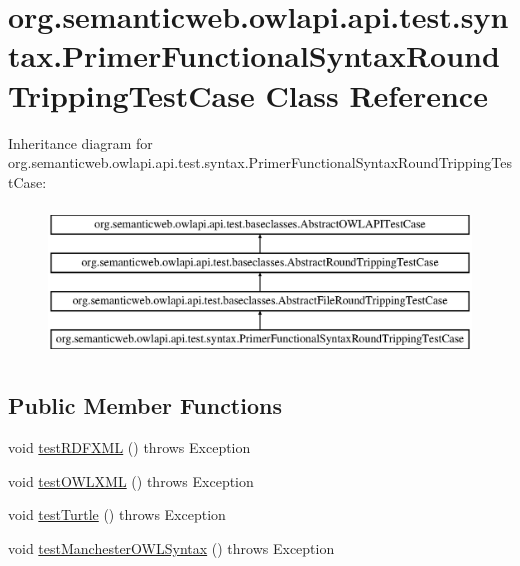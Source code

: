 \hypertarget{classorg_1_1semanticweb_1_1owlapi_1_1api_1_1test_1_1syntax_1_1_primer_functional_syntax_round_tripping_test_case}{\section{org.\-semanticweb.\-owlapi.\-api.\-test.\-syntax.\-Primer\-Functional\-Syntax\-Round\-Tripping\-Test\-Case Class Reference}
\label{classorg_1_1semanticweb_1_1owlapi_1_1api_1_1test_1_1syntax_1_1_primer_functional_syntax_round_tripping_test_case}
}
Inheritance diagram for org.\-semanticweb.\-owlapi.\-api.\-test.\-syntax.\-Primer\-Functional\-Syntax\-Round\-Tripping\-Test\-Case\-:\begin{figure}[H]
\begin{center}
\leavevmode
\includegraphics[height=4.000000cm]{classorg_1_1semanticweb_1_1owlapi_1_1api_1_1test_1_1syntax_1_1_primer_functional_syntax_round_tripping_test_case}
\end{center}
\end{figure}
\subsection*{Public Member Functions}
\begin{DoxyCompactItemize}
\item 
void \hyperlink{classorg_1_1semanticweb_1_1owlapi_1_1api_1_1test_1_1syntax_1_1_primer_functional_syntax_round_tripping_test_case_a316cb381d11c546f16313dea9ced056a}{test\-R\-D\-F\-X\-M\-L} ()  throws Exception 
\item 
void \hyperlink{classorg_1_1semanticweb_1_1owlapi_1_1api_1_1test_1_1syntax_1_1_primer_functional_syntax_round_tripping_test_case_a9140986b22efa92f1cca1822c5839be7}{test\-O\-W\-L\-X\-M\-L} ()  throws Exception 
\item 
void \hyperlink{classorg_1_1semanticweb_1_1owlapi_1_1api_1_1test_1_1syntax_1_1_primer_functional_syntax_round_tripping_test_case_a081ee4bb2902d1d9480ba2cc658a169d}{test\-Turtle} ()  throws Exception 
\item 
void \hyperlink{classorg_1_1semanticweb_1_1owlapi_1_1api_1_1test_1_1syntax_1_1_primer_functional_syntax_round_tripping_test_case_a2e61bbef3be60b4ad3206ebd337b228d}{test\-Manchester\-O\-W\-L\-Syntax} ()  throws Exception 
\end{DoxyCompactItemize}
